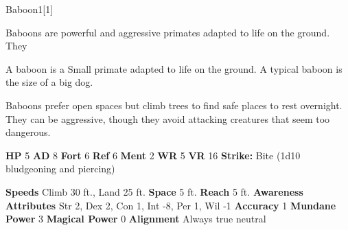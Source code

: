   \begin{monsection}{Baboon}{1}[1]
    \vspace{-1em}\vspace{-1em}
    \vspace{0em}

    
      Baboons are powerful and aggressive primates adapted to life on the ground.
      They
    
        A baboon is a Small primate adapted to life on the ground.
        A typical baboon is the size of a big dog.
      
        Baboons prefer open spaces but climb trees to find safe places to rest overnight.
        They can be aggressive, though they avoid attacking creatures that seem too dangerous.
      

    \begin{spellcontent}
      \begin{spelltargetinginfo}
        \pari \textbf{HP} 5 \monsep
          \textbf{AD} 8 \monsep
          \textbf{Fort} 6 \monsep
          \textbf{Ref} 6 \monsep
          \textbf{Ment} 2
        \pari \textbf{WR} 5 \monsep
        \textbf{VR} 16
        \pari \textbf{Strike:}
            Bite  (1d10 bludgeoning and piercing)
      \end{spelltargetinginfo}
    \end{spellcontent}
    \begin{monsterfooter}
      \pari \textbf{Speeds} Climb 30 ft., Land 25 ft. \monsep
        \textbf{Space} 5 ft. \monsep
        \textbf{Reach} 5 ft.
      \pari \textbf{Awareness} 
      \pari \textbf{Attributes}
        Str 2, Dex 2,
        Con 1, Int -8,
        Per 1, Wil -1
      \pari \textbf{Accuracy} 1 \monsep
        \textbf{Mundane Power} 3 \monsep
      \textbf{Magical Power} 0
      \pari \textbf{Alignment} Always true neutral
    \end{monsterfooter}
  \end{monsection}
  

